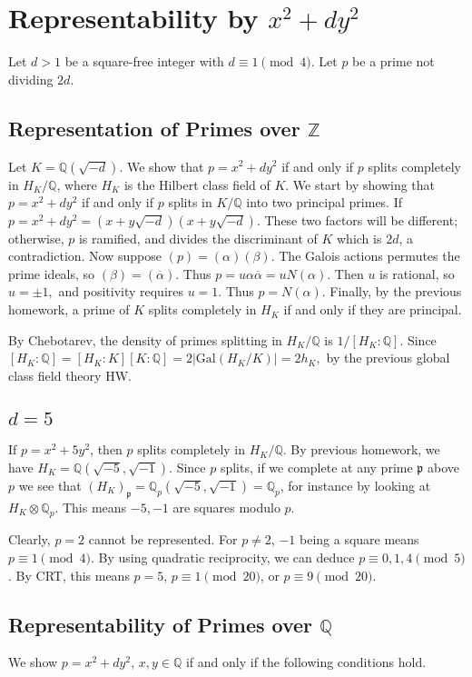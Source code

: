 \documentclass[12pt]{amsart}
\theoremstyle{named}
\newcommand{\prim}{\mathfrak{p}}
\newcommand{\Z}{\mathbb{Z}}
\newcommand{\Q}{\mathbb{Q}}
\newcommand{\Qp}{\Q_p}
\begin{document}
\section{Representability by $x^2 + dy^2$}
Let $d > 1$ be a square-free integer with $d \equiv 1 \pmod 4$. Let $p$ be a
prime not dividing $2d$.

\subsection{Representation of Primes over $\Z$} Let $K = \Q(\sqrt{-d})$.
We show that
$p = x^2 + dy^2$ if and only if $p$ splits completely in $H_K/\Q$, where $H_K$
is the Hilbert class field of $K$. We start by showing that $p = x^2 + dy^2$ if
and only if $p$ splits in $K/\Q$ into two principal primes. If
$p = x^2 + dy^2 = (x + y\sqrt{-d})(x + y\sqrt{-d})$. These two factors will be
different; otherwise, $p$ is ramified, and divides the discriminant of $K$
which is $2d$, a contradiction. Now suppose $(p) = (\alpha) (\beta).$ The
Galois actions permutes the prime ideals, so $(\beta) = (\overline{\alpha})$.
Thus $p = u \alpha \overline{\alpha} = u N(\alpha)$. Then $u$ is rational, so
$u = \pm 1,$ and positivity requires $u = 1$. Thus $p = N(\alpha)$. Finally,
by the previous homework, a prime of $K$ splits completely in $H_K$ if and only 
if they are principal.

By Chebotarev, the density of primes splitting in $H_K/\Q$ is $1/[H_K : \Q]$.
Since $[H_K : \Q] = [H_K : K][K : \Q] = 2|\mathrm{Gal}(H_K/K)| = 2h_K,$ by
the previous global class field theory HW.

\subsection{$d = 5$} If $p = x^2 + 5y^2$, then $p$ splits completely in
$H_K/\Q$. By previous homework, we have $H_K = \Q(\sqrt{-5}, \sqrt{-1})$. Since
$p$ splits, if we complete at any prime $\prim$ above $p$ we see that
$(H_K)_\prim = \Q_p(\sqrt{-5}, \sqrt{-1}) = \Qp$, for instance by looking at
$H_K \otimes \Qp$. This means $-5, -1$ are squares modulo $p$.

Clearly, $p = 2$ cannot be represented.
For $p \neq 2$, $-1$ being a square means $p \equiv 1 \pmod 4$. By using
quadratic reciprocity, we can deduce $p \equiv 0, 1, 4 \pmod 5$. By CRT,
this means $p = 5$, $p \equiv 1 \pmod{20}$, or $p \equiv 9 \pmod{20}$.



\subsection{Representability of Primes over $\Q$} We show $p = x^2 + dy^2$,
$x, y \in \Q$ if and only if the following conditions hold.
\end{document}

